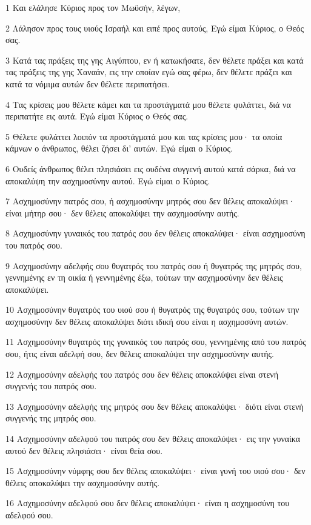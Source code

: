\par 1 Και ελάλησε Κύριος προς τον Μωϋσήν, λέγων,
\par 2 Λάλησον προς τους υιούς Ισραήλ και ειπέ προς αυτούς, Εγώ είμαι Κύριος, ο Θεός σας.
\par 3 Κατά τας πράξεις της γης Αιγύπτου, εν ή κατωκήσατε, δεν θέλετε πράξει και κατά τας πράξεις της γης Χαναάν, εις την οποίαν εγώ σας φέρω, δεν θέλετε πράξει και κατά τα νόμιμα αυτών δεν θέλετε περιπατήσει.
\par 4 Τας κρίσεις μου θέλετε κάμει και τα προστάγματά μου θέλετε φυλάττει, διά να περιπατήτε εις αυτά. Εγώ είμαι Κύριος ο Θεός σας.
\par 5 Θέλετε φυλάττει λοιπόν τα προστάγματά μου και τας κρίσεις μου· τα οποία κάμνων ο άνθρωπος, θέλει ζήσει δι' αυτών. Εγώ είμαι ο Κύριος.
\par 6 Ουδείς άνθρωπος θέλει πλησιάσει εις ουδένα συγγενή αυτού κατά σάρκα, διά να αποκαλύψη την ασχημοσύνην αυτού. Εγώ είμαι ο Κύριος.
\par 7 Ασχημοσύνην πατρός σου, ή ασχημοσύνην μητρός σου δεν θέλεις αποκαλύψει· είναι μήτηρ σου· δεν θέλεις αποκαλύψει την ασχημοσύνην αυτής.
\par 8 Ασχημοσύνην γυναικός του πατρός σου δεν θέλεις αποκαλύψει· είναι ασχημοσύνη του πατρός σου.
\par 9 Ασχημοσύνην αδελφής σου θυγατρός του πατρός σου ή θυγατρός της μητρός σου, γεννημένης εν τη οικία ή γεννημένης έξω, τούτων την ασχημοσύνην δεν θέλεις αποκαλύψει.
\par 10 Ασχημοσύνην θυγατρός του υιού σου ή θυγατρός της θυγατρός σου, τούτων την ασχημοσύνην δεν θέλεις αποκαλύψει διότι ιδική σου είναι η ασχημοσύνη αυτών.
\par 11 Ασχημοσύνην θυγατρός της γυναικός του πατρός σου, γεννημένης από του πατρός σου, ήτις είναι αδελφή σου, δεν θέλεις αποκαλύψει την ασχημοσύνην αυτής.
\par 12 Ασχημοσύνην αδελφής του πατρός σου δεν θέλεις αποκαλύψει είναι στενή συγγενής του πατρός σου.
\par 13 Ασχημοσύνην αδελφής της μητρός σου δεν θέλεις αποκαλύψει· διότι είναι στενή συγγενής της μητρός σου.
\par 14 Ασχημοσύνην αδελφού του πατρός σου δεν θέλεις αποκαλύψει· εις την γυναίκα αυτού δεν θέλεις πλησιάσει· είναι θεία σου.
\par 15 Ασχημοσύνην νύμφης σου δεν θέλεις αποκαλύψει· είναι γυνή του υιού σου· δεν θέλεις αποκαλύψει την ασχημοσύνην αυτής.
\par 16 Ασχημοσύνην αδελφού σου δεν θέλεις αποκαλύψει· είναι η ασχημοσύνη του αδελφού σου.
